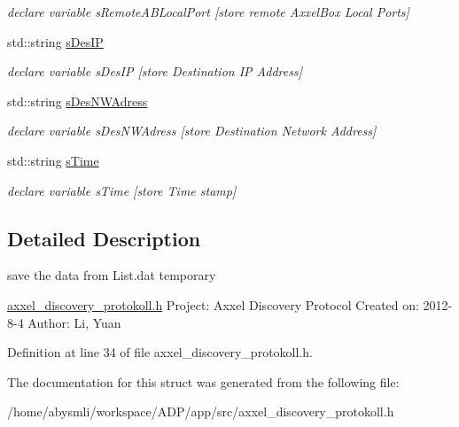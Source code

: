 \begin{DoxyCompactItemize}
\begin{DoxyCompactList}\small\item\em declare variable s\-Remote\-A\-B\-Local\-Port \mbox{[}store remote Axxel\-Box Local Ports\mbox{]} \end{DoxyCompactList}\item 
\hypertarget{structstListContainer_ab4fde5a0381565943612e2e672b02513}{std\-::string \hyperlink{structstListContainer_ab4fde5a0381565943612e2e672b02513}{s\-Des\-I\-P}}\label{structstListContainer_ab4fde5a0381565943612e2e672b02513}

\begin{DoxyCompactList}\small\item\em declare variable s\-Des\-I\-P \mbox{[}store Destination I\-P Address\mbox{]} \end{DoxyCompactList}\item 
\hypertarget{structstListContainer_ae886a76fb72d96cbc124544538905ef8}{std\-::string \hyperlink{structstListContainer_ae886a76fb72d96cbc124544538905ef8}{s\-Des\-N\-W\-Adress}}\label{structstListContainer_ae886a76fb72d96cbc124544538905ef8}

\begin{DoxyCompactList}\small\item\em declare variable s\-Des\-N\-W\-Adress \mbox{[}store Destination Network Address\mbox{]} \end{DoxyCompactList}\item 
\hypertarget{structstListContainer_acec007ec5b8190c8bf0242980b0b7528}{std\-::string \hyperlink{structstListContainer_acec007ec5b8190c8bf0242980b0b7528}{s\-Time}}\label{structstListContainer_acec007ec5b8190c8bf0242980b0b7528}

\begin{DoxyCompactList}\small\item\em declare variable s\-Time \mbox{[}store Time stamp\mbox{]} \end{DoxyCompactList}\end{DoxyCompactItemize}


\subsection{Detailed Description}
save the data from List.\-dat temporary 

\hyperlink{axxel__discovery__protokoll_8h_source}{axxel\-\_\-discovery\-\_\-protokoll.\-h} Project\-: Axxel Discovery Protocol Created on\-: 2012-\/8-\/4 Author\-: Li, Yuan 

Definition at line 34 of file axxel\-\_\-discovery\-\_\-protokoll.\-h.



The documentation for this struct was generated from the following file\-:\begin{DoxyCompactItemize}
\item 
/home/abysmli/workspace/\-A\-D\-P/app/src/axxel\-\_\-discovery\-\_\-protokoll.\-h\end{DoxyCompactItemize}
